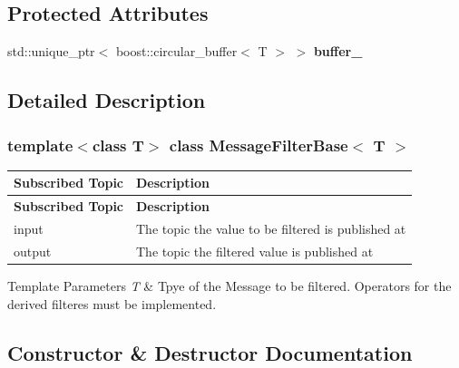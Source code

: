 \subsection*{Protected Attributes}
\begin{DoxyCompactItemize}
\item 
\mbox{\label{classMessageFilterBase_a0b7db0e443e75ce02ef154f233adc97d}} 
std\+::unique\+\_\+ptr$<$ boost\+::circular\+\_\+buffer$<$ T $>$ $>$ {\bfseries buffer\+\_\+}
\end{DoxyCompactItemize}


\subsection{Detailed Description}
\subsubsection*{template$<$class T$>$\newline
class Message\+Filter\+Base$<$ T $>$}

\tabulinesep=1mm
\begin{longtabu} spread 0pt [c]{*{2}{|X[-1]}|}
\hline
\rowcolor{\tableheadbgcolor}\textbf{ Subscribed Topic}&\textbf{ Description  }\\
\endfirsthead
\hline
\endfoot
\hline
\rowcolor{\tableheadbgcolor}\textbf{ Subscribed Topic}&\textbf{ Description  }\\
\endhead
input&The topic the value to be filtered is published at \\
output&The topic the filtered value is published at \\
\end{longtabu}



\begin{DoxyTemplParams}{Template Parameters}
{\em T} & Tpye of the Message to be filtered. Operators for the derived filteres must be implemented. \\
\hline
\end{DoxyTemplParams}


\subsection{Constructor \& Destructor Documentation}
\mbox{\label{classMessageFilterBase_aeb8e41a157fef0bcf63bd8061eea4b4a}} 
